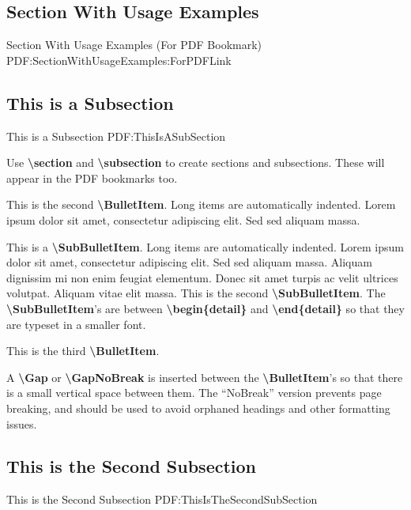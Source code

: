 \documentclass[letterpaper,MMMyyyy,nonstop]{simpleresumecv}
\newcommand{\CodeCommand}[1]{\mbox{\textbf{\textbackslash{#1}}}}
\begin{document}
\begin{body}

\section
{Section\newline
With\newline
Usage\newline
Examples}
{Section With Usage Examples (For PDF Bookmark)}
{PDF:SectionWithUsageExamples:ForPDFLink}

\subsection
{This is a Subsection}
{This is a Subsection}
{PDF:ThisIsASubSection}

\GapNoBreak
\BulletItem
Use \CodeCommand{section} and \CodeCommand{subsection} to create sections and subsections.
These will appear in the PDF bookmarks too.

\GapNoBreak
\BulletItem
This is the second \CodeCommand{BulletItem}.
Long items are automatically indented.
Lorem ipsum dolor sit amet, consectetur adipiscing elit.
Sed sed aliquam massa.
\begin{detail}
\SubBulletItem
This is a \CodeCommand{SubBulletItem}.
Long items are automatically indented.
Lorem ipsum dolor sit amet, consectetur adipiscing elit.
Sed sed aliquam massa.
Aliquam dignissim mi non enim feugiat elementum.
Donec sit amet turpis ac velit ultrices volutpat.
Aliquam vitae elit massa.
\SubBulletItem
This is the second \CodeCommand{SubBulletItem}.
\SubBulletItem
The \CodeCommand{SubBulletItem}'s are between
\CodeCommand{begin\{detail\}} and
\CodeCommand{end\{detail\}} so that they are typeset in a smaller font.
\end{detail}

\Gap
\BulletItem
This is the third \CodeCommand{BulletItem}.

\Gap
\BulletItem
A \CodeCommand{Gap} or \CodeCommand{GapNoBreak} is inserted between the \CodeCommand{BulletItem}'s so that there is a small vertical space between them.
The ``NoBreak'' version prevents page breaking, and should be used to avoid orphaned headings and other formatting issues.

\BigGap
\subsection
{This is the Second Subsection}
{This is the Second Subsection}
{PDF:ThisIsTheSecondSubSection}


\end{body}
\end{document}
